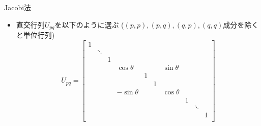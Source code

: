 \begin{frame}[t,fragile]{Jacobi法}
  \begin{itemize}
    \setlength{\itemsep}{1em}
  \item 直交行列$U_{pq}$を以下のように選ぶ ($(p,p),(p,q),(q,p),(q,q)$成分を除くと単位行列)
    \[
    U_{pq} =
    \begin{bmatrix}
      1 \\
      & \ddots \\
      & & 1 \\
      & & & \cos \theta & & & \sin \theta \\
      & & & & 1 \\
      & & & & & 1 \\
      & & & -\sin \theta & & & \cos \theta \\
      & & & & & & & 1 \\
      & & & & & & & & \ddots \\
      & & & & & & & & & 1 \\
    \end{bmatrix}
    \]
  \end{itemize}
\end{frame}
